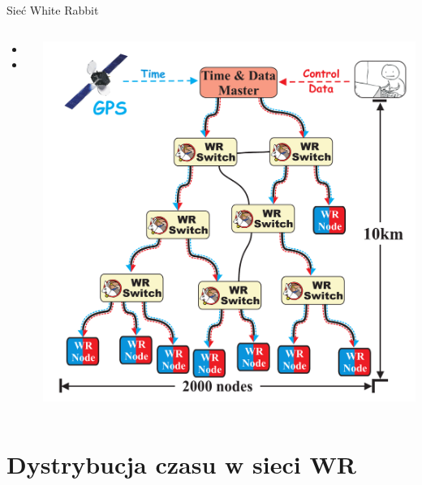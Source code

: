 \documentclass[compress,red]{beamer}
\begin{document}
\begin{frame}{Sieć White Rabbit}

\begin{columns}[c]

  \begin{itemize}
    \item \color{blue!90}{Sub-nanosekundowa synchronizacja}
    \vspace{0.2cm}
    \item \color{red}{Deterministyczna i niezawodna transmisja informacji kontrolnych (Control Message)}
  \end{itemize}

    \begin{center}
    \includegraphics[height=1.0\textwidth]{network/wr_network-new.pdf}
    \end{center}
\end{columns}

\end{frame}
\section{Dystrybucja czasu w sieci WR}
\end{document}
